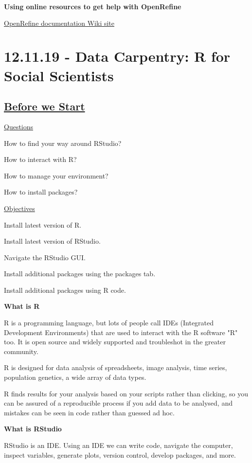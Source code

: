 \documentclass[12pt]{article}
\begin{document}
\textbf{Using online resources to get help with OpenRefine}

\href{https://github.com/OpenRefine/OpenRefine/wiki/Documentation-For-Users}{OpenRefine documentation Wiki site}

\newpage\section{12.11.19 - Data Carpentry: R for Social Scientists}

\subsection{\href{https://datacarpentry.org/r-socialsci/00-intro/index.html}{\textbf{Before we Start
}}}
\color{gray}
\underline{Questions}

How to find your way around RStudio?

How to interact with R?

How to manage your environment?

How to install packages?

\underline{Objectives}

Install latest version of R.

Install latest version of RStudio.

Navigate the RStudio GUI.

Install additional packages using the packages tab.

Install additional packages using R code.

\color{black}
\vspace{1em}

\textbf{What is R}

R is a programming language, but lots of people call IDEs (Integrated Development Environments) that are used to interact with the R software "R" too. It is open source and widely supported and troubleshot in the greater community.

R is designed for data analysis of spreadsheets, image analysis, time series, population genetics, a wide array of data types.

R finds results for your analysis based on your scripts rather than clicking, so you can be assured of a reproducible process if you add data to be analysed, and mistakes can be seen in code rather than guessed ad hoc. 

\textbf{What is RStudio}

RStudio is an IDE. Using an IDE we can write code, navigate the computer, inspect variables, generate plots, version control, develop packages, and more.
\end{document}
